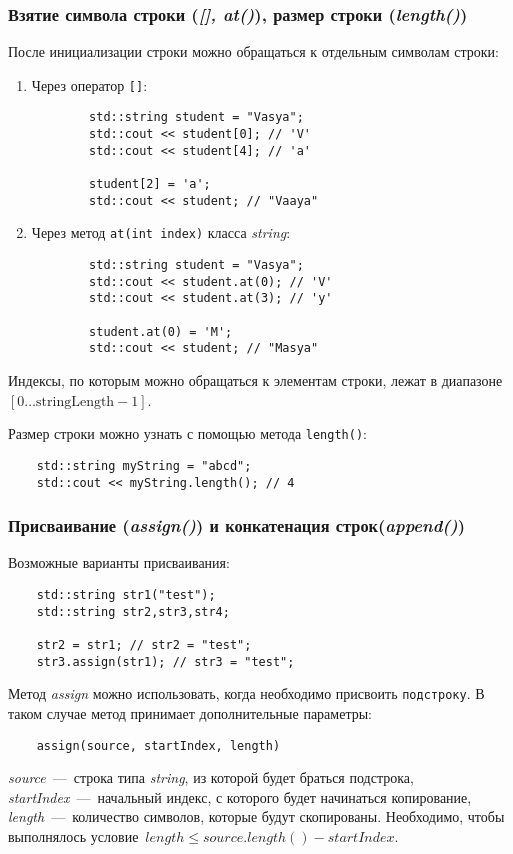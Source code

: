 \subsubsection{Взятие символа строки (\textit{[], at()}), размер строки (\textit{length()})}
После инициализации строки можно обращаться к отдельным символам строки:
\begin{enumerate}
    \item Через оператор \lstinline{[]}:
    \begin{lstlisting}
        std::string student = "Vasya";
        std::cout << student[0]; // 'V'
        std::cout << student[4]; // 'a'

        student[2] = 'a';
        std::cout << student; // "Vaaya"
    \end{lstlisting}
    \item Через метод \lstinline{at(int index)} класса \textit{string}:
    \begin{lstlisting}
        std::string student = "Vasya";
        std::cout << student.at(0); // 'V'
        std::cout << student.at(3); // 'y'

        student.at(0) = 'M';
        std::cout << student; // "Masya"
    \end{lstlisting}
\end{enumerate}

Индексы, по которым можно обращаться к элементам строки,
лежат в диапазоне~$\left[ 0 \ldots \text{stringLength} - 1 \right]$.

Размер строки можно узнать с помощью метода \lstinline{length()}:
\begin{lstlisting}
    std::string myString = "abcd";
    std::cout << myString.length(); // 4
\end{lstlisting}

\subsubsection{Присваивание (\textit{assign()}) и конкатенация строк(\textit{append()})}

Возможные варианты присваивания:
\begin{lstlisting}
    std::string str1("test");
    std::string str2,str3,str4;

    str2 = str1; // str2 = "test";
    str3.assign(str1); // str3 = "test";
\end{lstlisting}

Метод \textit{assign} можно использовать, когда необходимо присвоить \texttt{подстроку}. В таком случае метод принимает дополнительные параметры:
\begin{lstlisting}
    assign(source, startIndex, length)
\end{lstlisting}
\textit{source}~---~строка типа \textit{string}, из которой будет браться подстрока, \textit{startIndex}~---~начальный индекс, с которого будет начинаться копирование, \textit{length}~---~количество символов, которые будут скопированы. 
Необходимо, чтобы выполнялось условие~$length \leqslant source.length() - startIndex$.

